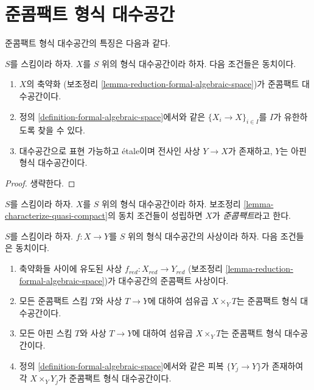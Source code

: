\section{준콤팩트 형식 대수공간}
\label{section-quasi-compact}

\noindent
준콤팩트 형식 대수공간의 특징은 다음과 같다.

\begin{lemma}
\label{lemma-characterize-quasi-compact}
$S$를 스킴이라 하자. $X$를 $S$ 위의 형식 대수공간이라 하자.
다음 조건들은 동치이다.
\begin{enumerate}
\item $X$의 축약화
(보조정리 \ref{lemma-reduction-formal-algebraic-space})가
준콤팩트 대수공간이다.
\item 정의 \ref{definition-formal-algebraic-space}에서와 같은
$\{X_i \to X\}_{i \in I}$를 $I$가 유한하도록 찾을 수 있다.
\item 대수공간으로 표현 가능하고 \'etale이며 전사인 사상
$Y \to X$가 존재하고, $Y$는 아핀 형식 대수공간이다.
\end{enumerate}
\end{lemma}

\begin{proof}
생략한다.
\end{proof}

\begin{definition}
\label{definition-quasi-compact}
$S$를 스킴이라 하자. $X$를 $S$ 위의 형식 대수공간이라 하자.
보조정리 \ref{lemma-characterize-quasi-compact}의 동치 조건들이
성립하면 $X$가 {\it 준콤팩트}라고 한다.
\end{definition}

\begin{lemma}
\label{lemma-characterize-quasi-compact-morphism}
$S$를 스킴이라 하자. $f : X \to Y$를 $S$ 위의 형식
대수공간의 사상이라 하자. 다음 조건들은 동치이다.
\begin{enumerate}
\item 축약화들 사이에 유도된 사상
$f_{red} : X_{red} \to Y_{red}$
(보조정리 \ref{lemma-reduction-formal-algebraic-space})가
대수공간의 준콤팩트 사상이다.
\item 모든 준콤팩트 스킴 $T$와 사상 $T \to Y$에 대하여
섬유곱 $X \times_Y T$는 준콤팩트 형식 대수공간이다.
\item 모든 아핀 스킴 $T$와 사상 $T \to Y$에 대하여
섬유곱 $X \times_Y T$는 준콤팩트 형식 대수공간이다.
\item 정의 \ref{definition-formal-algebraic-space}에서와 같은 피복
$\{Y_j \to Y\}$가 존재하여 각 $X \times_Y Y_j$가
준콤팩트 형식 대수공간이다.
\end{enumerate}
\end{lemma}

